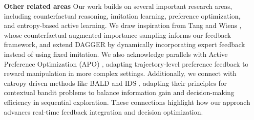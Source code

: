 \textbf{Other related areas}
Our work builds on several important research areas, including counterfactual reasoning, imitation learning, preference optimization, and entropy-based active learning. We draw inspiration from Tang and Wiens \cite{tang2023counterfactual}, whose counterfactual-augmented importance sampling informs our feedback framework, and extend DAGGER \cite{ross2011reduction} by dynamically incorporating expert feedback instead of using fixed imitation. We also acknowledge parallels with Active Preference Optimization (APO) \cite{das2024active}, adapting trajectory-level preference feedback to reward manipulation in more complex settings. Additionally, we connect with entropy-driven methods like BALD \cite{houlsby2011bayesian} and IDS \cite{russo2014learning}, adapting their principles for contextual bandit problems to balance information gain and decision-making efficiency in sequential exploration. These connections highlight how our approach advances real-time feedback integration and decision optimization.
